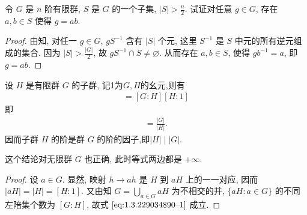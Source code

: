 \documentclass[../../main.tex]{subfiles}%
\begin{document}
\begin{example}
令 $G$ 是 $n$ 阶有限群, $S$ 是 $G$ 的一个子集, $|S| > \frac{n}{2}$. 试证对任意 $g \in G$, 存在 $a,b \in S$ 使得 $g = ab$.
\end{example}
\begin{proof}

由知, 对任一 $g \in G$, $gS^{-1}$ 含有 $|S|$ 个元, 这里 $S^{-1}$ 是 $S$ 中元的所有逆元组成的集合. 因为 $|S| > \frac{|G|}{2}$, 故 $gS^{-1} \cap S \neq \varnothing$. 从而存在 $a,b \in S$, 使得 $gb^{-1} = a$, 即 $g = ab$.

\end{proof}

\begin{theorem}[Lagrange定理]\label{theorem:抽象代数--Lagrange定理}
设 \( H \) 是有限群 \( G \) 的子群, 记1为$G,H$的幺元,则有
\begin{align}
[G:1] = [G:H][H:1] \label{eq:1.3.229034890--1}
\end{align}
即
\begin{align*}
[G:H]=\frac{|G|}{|H|}.
\end{align*}
因而子群 \( H \) 的阶是群 \( G \) 的阶的因子,即$|H|\mid |G|$.
\end{theorem}
\begin{remark}
这个结论对无限群 \( G \) 也正确, 此时等式两边都是 \( +\infty \).
\end{remark}
\begin{proof}

设 \( a \in G \). 显然, 映射 \( h \to ah \) 是 \( H \) 到 \( aH \) 上的一一对应, 因而 \( |aH| = |H| = [H:1] \). 又由知 \( G = \bigcup\limits_{a \in G} aH \) 为不相交的并, \( \{aH:a\in G\} \) 的不同左陪集个数为 \( [G:H] \), 故式 \(\eqref{eq:1.3.229034890--1}\) 成立.

\end{proof}
\end{document}
